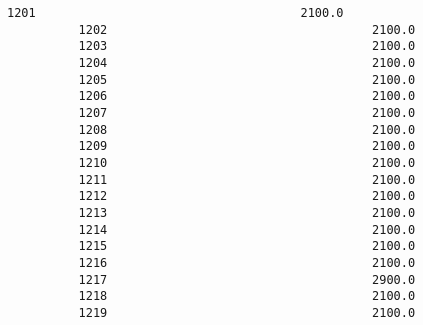 \documentclass[11pt]{article}
\begin{document}
\begin{Verbatim}[commandchars=\\\{\}]
          1201                                     2100.0   
          1202                                     2100.0   
          1203                                     2100.0   
          1204                                     2100.0   
          1205                                     2100.0   
          1206                                     2100.0   
          1207                                     2100.0   
          1208                                     2100.0   
          1209                                     2100.0   
          1210                                     2100.0   
          1211                                     2100.0   
          1212                                     2100.0   
          1213                                     2100.0   
          1214                                     2100.0   
          1215                                     2100.0   
          1216                                     2100.0   
          1217                                     2900.0   
          1218                                     2100.0   
          1219                                     2100.0   
          

\end{Verbatim}
\end{document}
